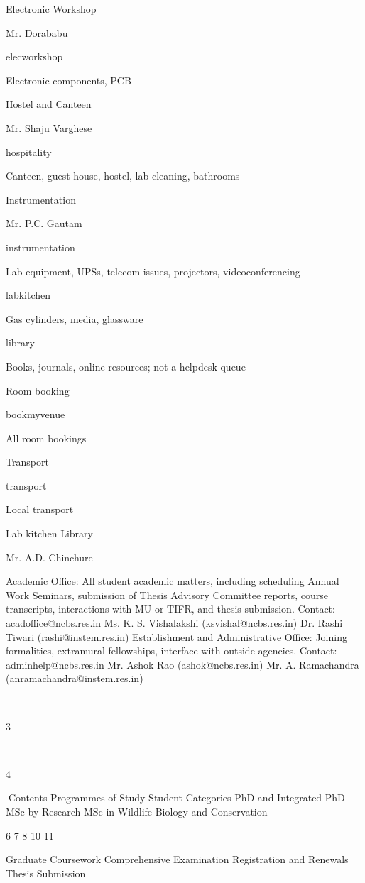 \documentclass[a4paper,10pt]{article}
\begin{document}
Electronic
Workshop

Mr. Dorababu

elecworkshop

Electronic components, PCB

Hostel and
Canteen

Mr. Shaju Varghese

hospitality

Canteen, guest house, hostel, lab
cleaning, bathrooms

Instrumentation

Mr. P.C. Gautam

instrumentation

Lab equipment, UPSs, telecom
issues, projectors, videoconferencing

labkitchen

Gas cylinders, media, glassware

library

Books, journals, online resources;
not a helpdesk queue

Room booking

bookmyvenue

All room bookings

Transport

transport

Local transport

Lab kitchen
Library

Mr. A.D. Chinchure

Academic Office: All student academic matters, including scheduling Annual Work Seminars, submission of
Thesis Advisory Committee reports, course transcripts, interactions with MU or TIFR, and thesis submission.
Contact: acadoffice@ncbs.res.in
Ms. K. S. Vishalakshi (ksvishal@ncbs.res.in)
Dr. Rashi Tiwari (rashi@instem.res.in)
Establishment and Administrative Office: Joining formalities, extramural fellowships, interface with outside
agencies.
Contact: adminhelp@ncbs.res.in
Mr. Ashok Rao (ashok@ncbs.res.in)
Mr. A. Ramachandra (anramachandra@instem.res.in)

	
  

3	
  

	
  

4	
  

Contents
Programmes of Study
Student Categories
PhD and Integrated-PhD
MSc-by-Research
MSc in Wildlife Biology and Conservation

6
7
8
10
11

Graduate Coursework
Comprehensive Examination
Registration and Renewals
Thesis Submission
\end{document}

